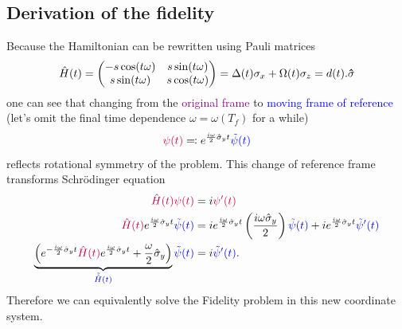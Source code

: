 \subsection{Derivation of the fidelity}
Because the Hamiltonian can be rewritten using Pauli matrices
\begin{equation}
    \hat{H}(t) = 
        \begin{pmatrix}
         -s \cos (t \omega ) & s \sin (t \omega ) \\
         s \sin (t \omega ) & s \cos (t \omega ) \\
        \end{pmatrix}
        =\Delta(t)\sigma_x+ \Omega(t)\sigma_z= d(t).\mathbf{\hat\sigma}
\end{equation}
one can see that changing from the \textcolor{purple}{original frame} to \textcolor{blue}{moving frame of reference} (let's omit the final time dependence $\omega=\omega(T_f)$ for a while) 
\begin{equation}
    \textcolor{purple}{\psi(t)} \eqqcolon e^{\frac{i \omega}{2}\hat\sigma_y t} \textcolor{blue}{\tilde\psi(t)}
\end{equation}
reflects rotational symmetry of the problem. This change of reference frame transforms Schr\"odinger equation
\begin{equation}
    \begin{split}
        \textcolor{purple}{\hat{H}(t)\psi(t)} &= i\textcolor{purple}{\psi'(t)}\\
        \textcolor{purple}{\hat{H}(t)} e^{\frac{i \omega}{2}\hat\sigma_y t}\textcolor{blue}{\tilde\psi(t)} &= i e^{\frac{i \omega}{2}\hat\sigma_y t} \left(\frac{i\omega\hat\sigma_y}{2}\right)\textcolor{blue}{\tilde\psi(t)}+ie^{\frac{i \omega}{2}\hat\sigma_y t}\textcolor{blue}{\tilde\psi'(t)}\\
        \underbrace{\left(e^{-\frac{i \omega}{2}\hat\sigma_y t} \textcolor{purple}{\hat{H}(t)}e^{\frac{i \omega}{2}\hat\sigma_y t}+ \frac{\omega}{2}\hat\sigma_y\right)}_{\textcolor{blue}{\tilde{\hat{H}}(t)}}\textcolor{blue}{\tilde\psi(t)}&=i\textcolor{blue}{\tilde\psi'(t)}.
    \end{split}
\end{equation}
Therefore we can equivalently solve the Fidelity problem in this new coordinate system.

